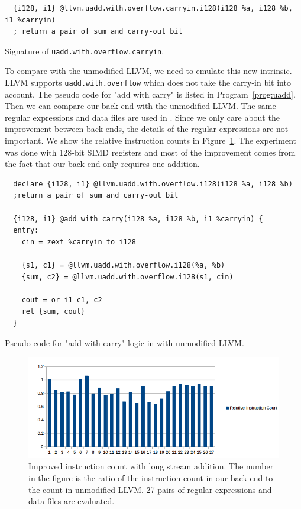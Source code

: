 \begin{program}[htbp!]
\begin{verbatim}
  {i128, i1} @llvm.uadd.with.overflow.carryin.i128(i128 %a, i128 %b, i1 %carryin)
  ; return a pair of sum and carry-out bit
\end{verbatim}
\caption[Signature of {\tt uadd.with.overflow.carryin}]{Signature of {\tt uadd.with.overflow.carryin}.}
\label{prog:uadd_carryin}
\end{program}

To compare with the unmodified LLVM, we need to emulate this new intrinsic. LLVM supports {\tt uadd.with.overflow} which does not take the carry-in bit into account. The pseudo code for "add with carry" is listed in Program~\ref{prog:uadd}. Then we can compare our back end with the unmodified LLVM\@. The same regular expressions and data files are used in \cite{rob_regex}. Since we only care about the improvement between back ends, the details of the regular expressions are not important. We show the relative instruction counts in Figure~\ref{fig:inst_count_long_add}. The experiment was done with 128-bit SIMD registers and most of the improvement comes from the fact that our back end only requires one addition.

\begin{program}[htbp!]
\begin{verbatim}
  declare {i128, i1} @llvm.uadd.with.overflow.i128(i128 %a, i128 %b)
  ;return a pair of sum and carry-out bit

  {i128, i1} @add_with_carry(i128 %a, i128 %b, i1 %carryin) {
  entry:
    cin = zext %carryin to i128

    {s1, c1} = @llvm.uadd.with.overflow.i128(%a, %b)
    {sum, c2} = @llvm.uadd.with.overflow.i128(s1, cin)

    cout = or i1 c1, c2
    ret {sum, cout}
  }
\end{verbatim}
\caption[Pseudo code for "add with carry" logic in with unmodified LLVM]{Pseudo code for "add with carry" logic in with unmodified LLVM\@.}
\label{prog:uadd}
\end{program}

\begin{figure}[htbp!]
\centering
\includegraphics[width=140mm]{draw/inst_count_long_add.png}
\caption[Improvement with long stream addition and the new intrinsic in instruction count]{Improved instruction count with long stream addition. The number in the figure is the ratio of the instruction count in our back end to the count in unmodified LLVM. 27 pairs of regular expressions and data files are evaluated.}
\label{fig:inst_count_long_add}
\end{figure}

